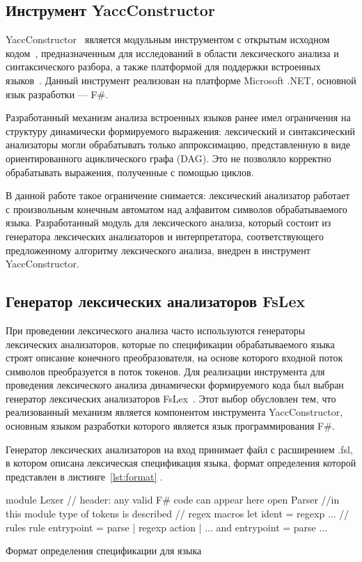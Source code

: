 \documentclass[10pt, conference, compsocconf]{IEEEtran}
\begin{document}
\subsection{Инструмент YaccConstructor}

YaccConstructor~\cite{YC_article} является модульным инструментом с открытым исходном кодом~\cite{YCrepo}, предназначенным для исследований в области лексического анализа и синтаксического разбора, а  также платформой для поддержки встроенных языков~\cite{YC_SECR}. Данный инструмент реализован на платформе Microsoft .NET, основной язык разработки --- F\#.  

Разработанный механизм анализа встроенных языков ранее имел ограничения на структуру динамически формируемого выражения: лексический и синтаксический анализаторы могли обрабатывать только аппроксимацию, представленную в виде ориентированного ациклического графа (DAG). Это не позволяло корректно обрабатывать выражения, полученные с помощью циклов.
	
В данной работе такое ограничение снимается: лексический анализатор работает с произвольным конечным автоматом над алфавитом символов обрабатываемого языка. Разработанный модуль для лексического анализа, который состоит из генератора лексических анализаторов и интерпретатора, соответствующего предложенному алгоритму лексического анализа, внедрен в инструмент YaccConstructor.    

\subsection{Генератор лексических анализаторов FsLex}

При проведении лексического анализа часто используются генераторы лексических анализаторов, которые по спецификации обрабатываемого языка строят описание конечного преобразователя, на основе которого входной поток символов преобразуется в поток токенов. Для реализации инструмента для проведения лексического анализа динамически формируемого кода был выбран генератор лексических анализаторов FsLex~\cite{FsLex}. Этот выбор обусловлен тем, что реализованный механизм является компонентом инструмента YaccConstructor, основным языком разработки которого является язык программирования F\#. 

Генератор лексических анализаторов на вход принимает файл с расширением .fsl, в котором описана лексическая спецификация  языка, формат определения которой представлен в листинге~\ref{lst:format} .


\begin{listing}[H]
\begin{pyglist}[language=csharp,numbers=none,numbersep=5pt]
{
module Lexer
// header: any valid F# code can appear here
open Parser //in this module type of tokens is described
}
// regex macros 
let ident = regexp ... 
// rules   
rule entrypoint = parse
| regexp { action }
| ... 
and entrypoint = parse
...
\end{pyglist}
\caption{Формат определения спецификации для языка}
\label{lst:format}
\end{listing}
\end{document}
